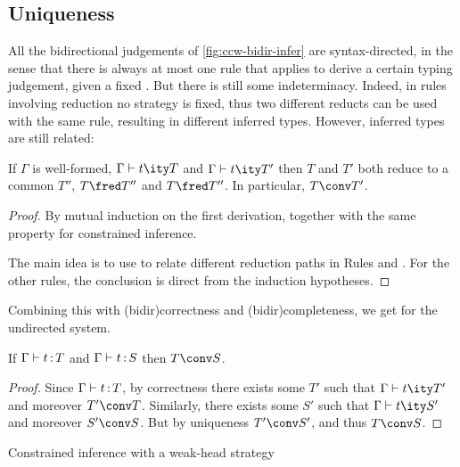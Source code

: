 \subsection{Uniqueness}

All the bidirectional judgements of \cref{fig:ccw-bidir-infer} are syntax-directed,
in the sense that there is always at most one rule that applies to derive a certain typing judgement, given a fixed .
But there is still some indeterminacy.
Indeed, in rules involving reduction no strategy is fixed, thus two different reducts can be used with the same rule, resulting in different inferred types.
However, inferred types are still related:

\begin{theorem}
  \label{thm:unique-inf}
  If $\Gamma$ is well-formed,
  $\inferty{\Gamma}{t}{T}$ and $\inferty{\Gamma}{t}{T'}$ then $T$ and $T'$ both reduce to a
  common $T''$, \eg $T \red T''$ and $T \red T''$. In particular, $T \conv T'$.
\end{theorem}

\begin{proof}
  By mutual induction on the first derivation, together with the same property for
  constrained inference.

  The main idea is to use  to relate different reduction paths in Rules
   and . For the other rules,
  the conclusion is direct from the induction hypotheses.
\end{proof}

Combining this with \kl(bidir){correctness} and \kl(bidir){completeness},
we get  for the undirected system.

\begin{theorem}
  \label{thm:unique-undir}
  If $\Gamma \vdash t \operatorname{\mathrel{:}} T$ and $\Gamma \vdash t \operatorname{\mathrel{:}} S$ then $T \conv S$.
\end{theorem}

\begin{proof}
  Since $\Gamma \vdash t \operatorname{\mathrel{:}} T$, by correctness
  there exists some $T'$ such that $\inferty{\Gamma}{t}{T'}$ and moreover $T' \conv T$.
  Similarly, there exists some $S'$ such that $\inferty{\Gamma}{t}{S'}$
  and moreover $S' \conv S$.
  But by uniqueness $T' \conv S'$, and thus $T \conv S$.
\end{proof}

\begin{marginfigure}
\caption{Constrained inference with a weak-head strategy}
\label{fig:wh-pinf}
\end{marginfigure}

